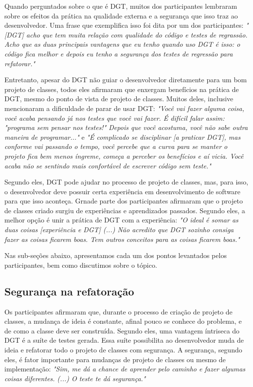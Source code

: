 Quando perguntados sobre o que é DGT, muitos dos participantes lembraram sobre
os efeitos da prática na qualidade externa e a segurança que isso traz
ao desenvolvedor.
Uma frase que exemplifica isso foi dita por um dos participantes:
\textit{"[DGT] acho que tem muita relação com qualidade do código e testes 
de regrassão. Acho que as duas principais vantagens que eu tenho quando uso DGT é isso: o código
fica melhor e depois eu tenho a segurança dos testes de regressão para refatorar."}

Entretanto, apesar do DGT não guiar o desenvolvedor diretamente para um bom projeto de classes,
todos eles afirmaram que enxergam benefícios na prática de DGT, mesmo do
ponto de vista de projeto de classes. Muitos deles, inclusive mencionaram a dificuldade
de parar de usar DGT:
\textit{"Você vai fazer alguma coisa, você acaba pensando já nos testes que você vai fazer. É difícil 
falar assim: "programa sem pensar nos testes!" Depois que você acostuma, você não sabe outra
maneira de programar..."} e \textit{"É complicado se disciplinar [a praticar DGT], mas conforme vai passando o tempo, 
você percebe que a curva para se manter o projeto fica bem menos íngreme, 
começa a perceber os benefícios e aí vicia. Você acaba não se sentindo
mais confortável de escrever código sem teste."}

Segundo eles, DGT pode ajudar no processo de projeto de classes, mas, para isso,
o desenvolvedor deve possuir certa experiência em desenvolvimento de software
para que isso aconteça. Grnade parte dos participantes afirmaram que o 
projeto de classes criado surgiu de experiências e aprendizados passados.
Segundo eles, a melhor opção é unir a prática de DGT com a experiência:
\textit{"O ideal é somar as duas coisas [experiência e DGT] (...) 
Não acredito que DGT sozinho consiga fazer as coisas ficarem boas. Tem outros conceitos
para as coisas ficarem boas."}

Nas sub-seções abaixo, apresentamos cada um dos pontos 
levantados pelos participantes, bem como discutimos sobre o tópico.

\subsection{Segurança na refatoração}

Os participantes afirmaram que, durante o processo de criação de projeto de classes, a mudança de ideia é
constante, afinal pouco se conhece do problema, e de como a classe deve ser construída. Segundo eles,
uma vantagem íntriseca do DGT é a suíte de testes gerada. Essa suíte possibilita ao desenvolvedor
muda de ideia e refatorar todo o projeto de classes com segurança.
A segurança, segundo eles, é fator importante para mudanças de projeto de classes ou mesmo de implementação:
\textit{"Sim, me dá a chance de aprender pelo caminho e fazer algumas coisas diferentes. (...) O teste te dá segurança."}

